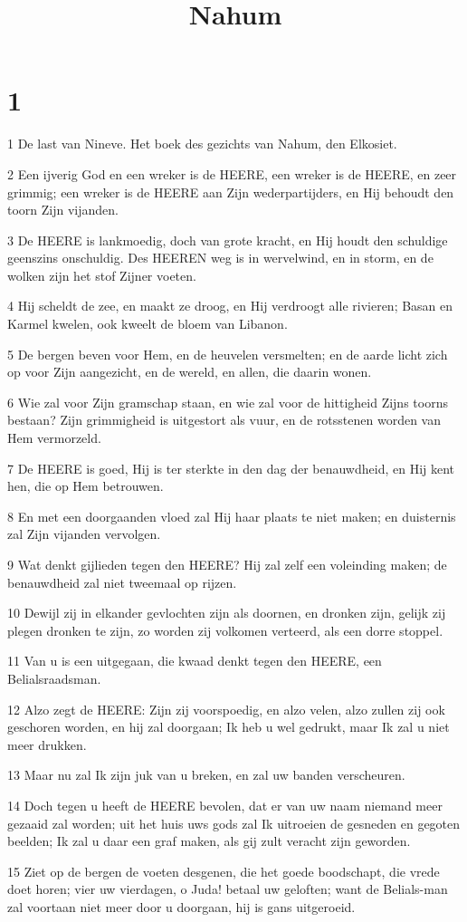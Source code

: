 

\title{Nahum}



\chapter{1}

\par 1 De last van Nineve. Het boek des gezichts van Nahum, den Elkosiet.
\par 2 Een ijverig God en een wreker is de HEERE, een wreker is de HEERE, en zeer grimmig; een wreker is de HEERE aan Zijn wederpartijders, en Hij behoudt den toorn Zijn vijanden.
\par 3 De HEERE is lankmoedig, doch van grote kracht, en Hij houdt den schuldige geenszins onschuldig. Des HEEREN weg is in wervelwind, en in storm, en de wolken zijn het stof Zijner voeten.
\par 4 Hij scheldt de zee, en maakt ze droog, en Hij verdroogt alle rivieren; Basan en Karmel kwelen, ook kweelt de bloem van Libanon.
\par 5 De bergen beven voor Hem, en de heuvelen versmelten; en de aarde licht zich op voor Zijn aangezicht, en de wereld, en allen, die daarin wonen.
\par 6 Wie zal voor Zijn gramschap staan, en wie zal voor de hittigheid Zijns toorns bestaan? Zijn grimmigheid is uitgestort als vuur, en de rotsstenen worden van Hem vermorzeld.
\par 7 De HEERE is goed, Hij is ter sterkte in den dag der benauwdheid, en Hij kent hen, die op Hem betrouwen.
\par 8 En met een doorgaanden vloed zal Hij haar plaats te niet maken; en duisternis zal Zijn vijanden vervolgen.
\par 9 Wat denkt gijlieden tegen den HEERE? Hij zal zelf een voleinding maken; de benauwdheid zal niet tweemaal op rijzen.
\par 10 Dewijl zij in elkander gevlochten zijn als doornen, en dronken zijn, gelijk zij plegen dronken te zijn, zo worden zij volkomen verteerd, als een dorre stoppel.
\par 11 Van u is een uitgegaan, die kwaad denkt tegen den HEERE, een Belialsraadsman.
\par 12 Alzo zegt de HEERE: Zijn zij voorspoedig, en alzo velen, alzo zullen zij ook geschoren worden, en hij zal doorgaan; Ik heb u wel gedrukt, maar Ik zal u niet meer drukken.
\par 13 Maar nu zal Ik zijn juk van u breken, en zal uw banden verscheuren.
\par 14 Doch tegen u heeft de HEERE bevolen, dat er van uw naam niemand meer gezaaid zal worden; uit het huis uws gods zal Ik uitroeien de gesneden en gegoten beelden; Ik zal u daar een graf maken, als gij zult veracht zijn geworden.
\par 15 Ziet op de bergen de voeten desgenen, die het goede boodschapt, die vrede doet horen; vier uw vierdagen, o Juda! betaal uw geloften; want de Belials-man zal voortaan niet meer door u doorgaan, hij is gans uitgeroeid.

